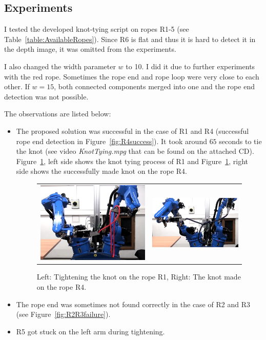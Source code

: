      
    \subsection{Experiments}
        I tested the developed knot-tying script on ropes R1-5 (see Table~\ref{table:AvailableRopes}). Since R6 is flat and thus it is hard to detect it in the depth image, it was omitted from the experiments.

        I also changed the width parameter $w$ to 10. I did it due to further experiments with the red rope. Sometimes the rope end and rope loop were very close to each other. If $w=15$, both connected components merged into one and the rope end detection was not possible.

       The observations are listed below:
%
        \begin{itemize}\itemsep 0pt
            \item The proposed solution was successful in the case of R1 and R4 (successful rope end detection in Figure~\ref{fig:R4success}). It took around $65$ seconds to tie the knot (see video \textit{KnotTying.mpg} that can be found on the attached CD). Figure~\ref{fig:R1R4KnotTightening}, left side shows the knot tying process of R1 and Figure~\ref{fig:R1R4KnotTightening}, right side shows the successfully made knot on the rope R4.

            \begin{figure}
                \centering
                \begin{tabular}{cc}
                \includegraphics[height=0.3\textwidth]{R1KnotTightening.png}
                &
                \includegraphics[height=0.3\textwidth]{R4KnotTightening.png}

                \end{tabular}
                \caption{Left: Tightening the knot on the rope R1, Right: The knot made on the rope R4.}
                \label{fig:R1R4KnotTightening}
            \end{figure}

            \item The rope end was sometimes not found correctly in the case of R2 and R3 (see Figure~\ref{fig:R2R3failure}).
            \item R5 got stuck on the left arm during tightening.
        \end{itemize}


